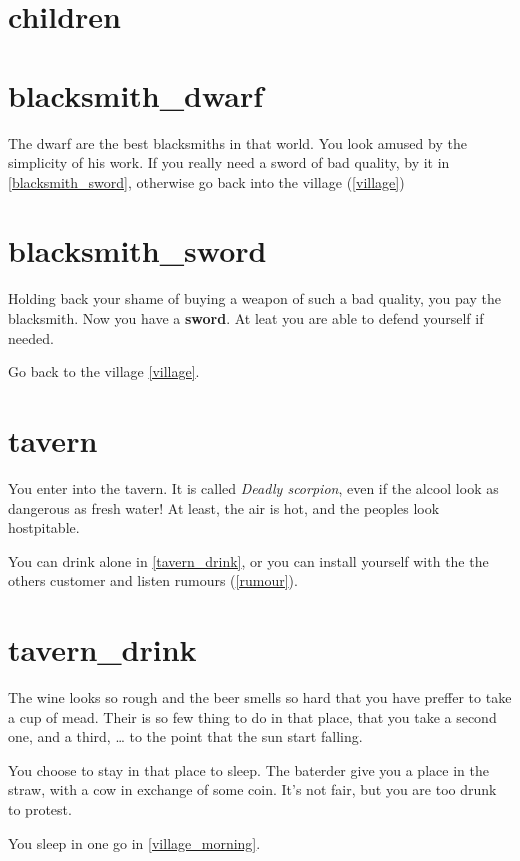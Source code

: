 \section{children}



\section{blacksmith_dwarf}

The dwarf are the best blacksmiths in that world. You look amused by the
simplicity of his work. If you really need a sword of bad quality, by it in
\ref{blacksmith_sword}, otherwise go back into the village (\ref{village})

\section{blacksmith_sword}

Holding back your shame of buying a weapon of such a bad quality, you pay the
blacksmith. Now you have a \textbf{sword}. At leat you are able to defend
yourself if needed.

Go back to the village \ref{village}.

\section{tavern}

You enter into the tavern. It is called \textit{Deadly scorpion}, even if the
alcool look as dangerous as fresh water! At least, the air is hot, and the
peoples look hostpitable.

You can drink alone in \ref{tavern_drink}, or you can install yourself with the
the others customer and listen rumours (\ref{rumour}).

\section{tavern_drink}

The wine looks so rough and the beer smells so hard that you have preffer to
take a cup of mead. Their is so few thing to do in that place, that you take a
second one, and a third, … to the point that the sun start falling.

You choose to stay in that place to sleep. The baterder give you a place in the
straw, with a cow in exchange of some coin. It's not fair, but you are too drunk
to protest.

You sleep in one go in \ref{village_morning}.

